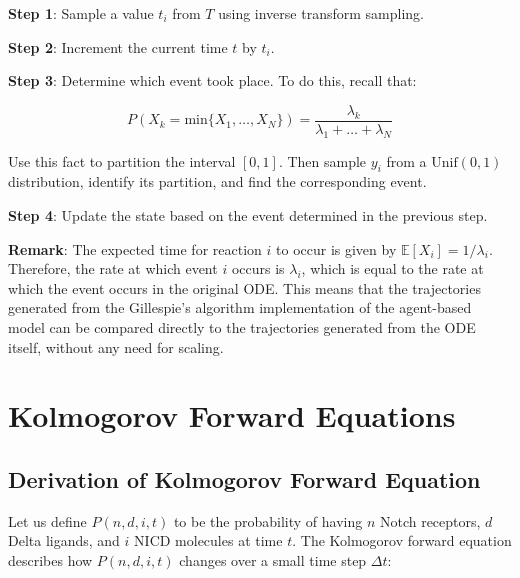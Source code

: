 \documentclass{article}
\begin{document}
\begin{flushleft}
\textbf{Step 1}: Sample a value $t_{i}$ from $T$ using inverse transform sampling. 

\medskip

\textbf{Step 2}: Increment the current time $t$ by $t_{i}$.

\medskip

\textbf{Step 3}: Determine which event took place. To do this, recall that:

$$P(X_{k} = \text{min} \{  X_{1}, \dots, X_{N} \}) = \frac{\lambda_{k}}{\lambda_{1} + \dots + \lambda_{N}}$$

Use this fact to partition the interval $[0, 1]$. Then sample $y_{i}$ from a $\text{Unif}(0, 1)$ distribution, identify its partition, and find the corresponding event.

\medskip

\textbf{Step 4}: Update the state based on the event determined in the previous step.

\medskip

\textbf{Remark}: The expected time for reaction $i$ to occur is given by $\mathbb{E}[X_{i}] = 1/\lambda_{i}$. Therefore, the rate at which event $i$ occurs is $\lambda_{i}$, which is equal to the rate at which the event occurs in the original ODE. This means that the trajectories generated from the Gillespie's algorithm implementation of the agent-based  model can be compared directly to the trajectories generated from the ODE itself, without any need for scaling.

\section{Kolmogorov Forward Equations}
\label{sec:kfe}


\subsection*{Derivation of Kolmogorov Forward Equation}

Let us define $P(n,d,i,t)$ to be the probability of having $n$ Notch receptors, $d$ Delta ligands, and $i$ NICD molecules at time $t$. The Kolmogorov forward equation describes how $P(n,d,i,t)$ changes over a small time step $\Delta t$:


\end{flushleft}
\end{document}
